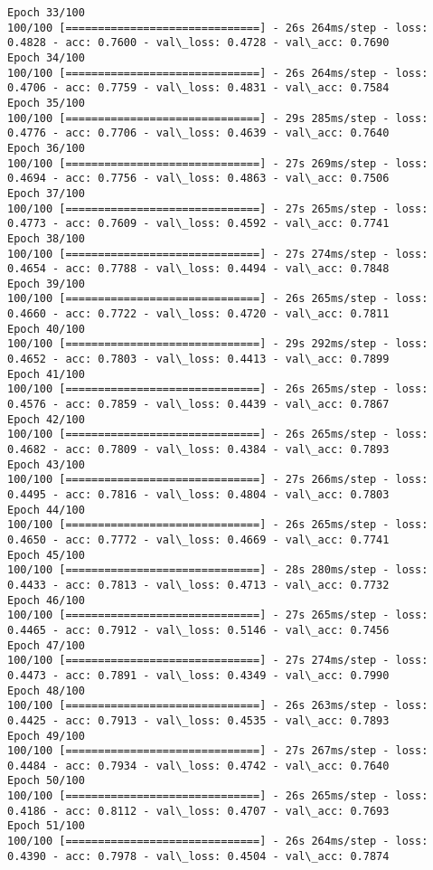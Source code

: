 \documentclass[11pt]{article}
\begin{document}
\begin{Verbatim}[commandchars=\\\{\}]
Epoch 33/100
100/100 [==============================] - 26s 264ms/step - loss: 0.4828 - acc: 0.7600 - val\_loss: 0.4728 - val\_acc: 0.7690
Epoch 34/100
100/100 [==============================] - 26s 264ms/step - loss: 0.4706 - acc: 0.7759 - val\_loss: 0.4831 - val\_acc: 0.7584
Epoch 35/100
100/100 [==============================] - 29s 285ms/step - loss: 0.4776 - acc: 0.7706 - val\_loss: 0.4639 - val\_acc: 0.7640
Epoch 36/100
100/100 [==============================] - 27s 269ms/step - loss: 0.4694 - acc: 0.7756 - val\_loss: 0.4863 - val\_acc: 0.7506
Epoch 37/100
100/100 [==============================] - 27s 265ms/step - loss: 0.4773 - acc: 0.7609 - val\_loss: 0.4592 - val\_acc: 0.7741
Epoch 38/100
100/100 [==============================] - 27s 274ms/step - loss: 0.4654 - acc: 0.7788 - val\_loss: 0.4494 - val\_acc: 0.7848
Epoch 39/100
100/100 [==============================] - 26s 265ms/step - loss: 0.4660 - acc: 0.7722 - val\_loss: 0.4720 - val\_acc: 0.7811
Epoch 40/100
100/100 [==============================] - 29s 292ms/step - loss: 0.4652 - acc: 0.7803 - val\_loss: 0.4413 - val\_acc: 0.7899
Epoch 41/100
100/100 [==============================] - 26s 265ms/step - loss: 0.4576 - acc: 0.7859 - val\_loss: 0.4439 - val\_acc: 0.7867
Epoch 42/100
100/100 [==============================] - 26s 265ms/step - loss: 0.4682 - acc: 0.7809 - val\_loss: 0.4384 - val\_acc: 0.7893
Epoch 43/100
100/100 [==============================] - 27s 266ms/step - loss: 0.4495 - acc: 0.7816 - val\_loss: 0.4804 - val\_acc: 0.7803
Epoch 44/100
100/100 [==============================] - 26s 265ms/step - loss: 0.4650 - acc: 0.7772 - val\_loss: 0.4669 - val\_acc: 0.7741
Epoch 45/100
100/100 [==============================] - 28s 280ms/step - loss: 0.4433 - acc: 0.7813 - val\_loss: 0.4713 - val\_acc: 0.7732
Epoch 46/100
100/100 [==============================] - 27s 265ms/step - loss: 0.4465 - acc: 0.7912 - val\_loss: 0.5146 - val\_acc: 0.7456
Epoch 47/100
100/100 [==============================] - 27s 274ms/step - loss: 0.4473 - acc: 0.7891 - val\_loss: 0.4349 - val\_acc: 0.7990
Epoch 48/100
100/100 [==============================] - 26s 263ms/step - loss: 0.4425 - acc: 0.7913 - val\_loss: 0.4535 - val\_acc: 0.7893
Epoch 49/100
100/100 [==============================] - 27s 267ms/step - loss: 0.4484 - acc: 0.7934 - val\_loss: 0.4742 - val\_acc: 0.7640
Epoch 50/100
100/100 [==============================] - 26s 265ms/step - loss: 0.4186 - acc: 0.8112 - val\_loss: 0.4707 - val\_acc: 0.7693
Epoch 51/100
100/100 [==============================] - 26s 264ms/step - loss: 0.4390 - acc: 0.7978 - val\_loss: 0.4504 - val\_acc: 0.7874

\end{Verbatim}
\end{document}
